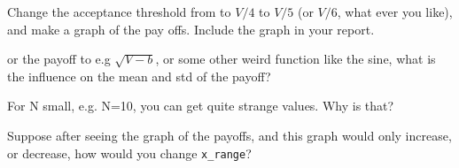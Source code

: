 \documentclass[assignments]{subfiles}
\begin{document}
\begin{exercise}
Change the acceptance threshold from to $V/4$ to $V/5$ (or $V/6$, what ever you like), and make a graph of the pay offs. Include the graph in your report.
\begin{solution}
\end{solution}
\end{exercise}

\begin{exercise}
or the payoff to e.g $\sqrt{V-b}$, or some other weird function like the sine, what is the influence on the mean and std of the payoff?
\begin{solution}
\end{solution}
\end{exercise}



\begin{exercise}
For N small, e.g. N=10, you can get quite strange values. Why is that?
\begin{solution}
\end{solution}
\end{exercise}


\begin{exercise}
Suppose after seeing the graph of the payoffs, and this graph would only increase, or decrease, how would you change \verb|x_range|?
\begin{solution}
\end{solution}
\end{exercise}
\end{document}
